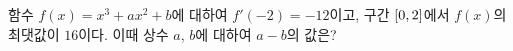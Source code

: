함수 $f(x)=x^3+ax^2+b$에 대하여 $f'(-2)=-12$이고, 구간 $[0{,}\mkern3mu\mathopen{}2]$에서 $f(x)$의 최댓값이 $16$이다. 이때 상수 $a$, $b$에 대하여 $a-b$의 값은?
